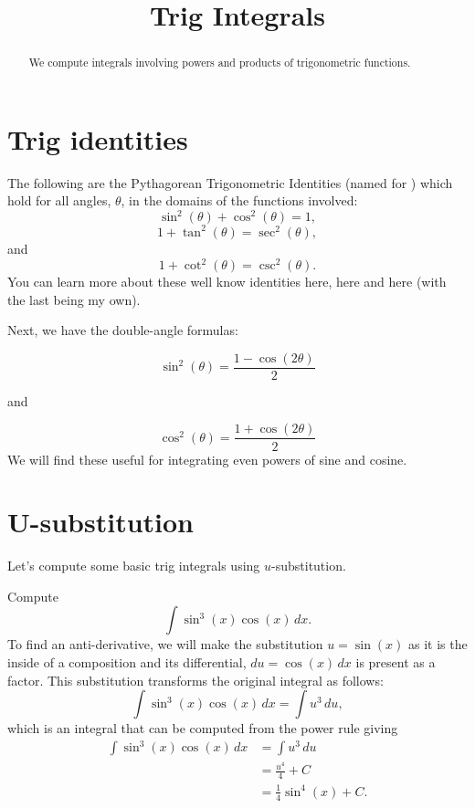 \documentclass{ximera}
\title{Trig Integrals}
\begin{document}
\begin{abstract}
We compute integrals involving powers and products of trigonometric functions.
\end{abstract}

\maketitle

\section{Trig identities}

The following are the Pythagorean Trigonometric Identities (named for ) which hold for all angles,
$\theta$, in the domains of the functions involved:
\[
\sin^2(\theta) + \cos^2(\theta) = 1,
\]
\[
1 + \tan^2(\theta) = \sec^2(\theta),
\]
and
\[
1 + \cot^2(\theta) = \csc^2(\theta).
\]
You can learn more about these well know identities here, here and here (with the last being my own).

Next, we have the double-angle formulas:

\[
\sin^2(\theta) = \frac{1-\cos(2\theta)}{2}
\]

and

\[
\cos^2(\theta) = \frac{1+\cos(2\theta)}{2}
\]
We will find these useful for integrating even powers of sine and cosine.

\section{U-substitution}
Let's compute some basic trig integrals using $u$-substitution.

\begin{example}
Compute
\[
\int \sin^3(x) \cos(x) \, dx.
\]
To find an anti-derivative, we will make the substitution $u = \sin(x)$ as it is the inside of a composition
and its differential, $du = \cos(x) \, dx$ is present as a factor. 
This substitution transforms the original integral as follows:
\[
\int \sin^3(x) \cos(x) \, dx = \int u^3 \, du,
\]
which is an integral that can be computed from the power rule giving
\begin{align*}
\int \sin^3(x) \cos(x) \, dx &= \int u^3 \, du\\
                             &= \frac{u^4}{4} + C\\
                             &= \frac14 \sin^4(x) + C.
\end{align*}

\end{example}
\end{document}
